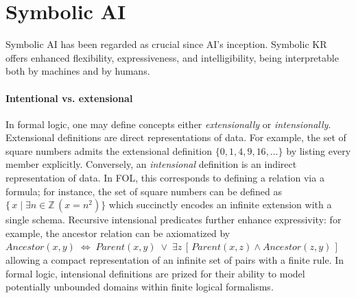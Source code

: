 \section[Symbolic AI]{Symbolic \Gls{AI}}\label{sec:symbolic-ai}
%
Symbolic \gls{AI} has been regarded as crucial since \gls{AI}'s inception.
%
Symbolic \gls{KR} offers enhanced flexibility, expressiveness, and intelligibility, being interpretable both by machines and by humans.

\paragraph{Intentional vs. extensional}
%
In formal logic, one may define concepts either \emph{extensionally} or \emph{intensionally}.
%
Extensional definitions are direct representations of data.
%
For example, the set of square numbers admits the extensional definition $\{0,1,4,9,16,\dots\}$ by listing every member explicitly.
%
Conversely, an \emph{intensional} definition is an indirect representation of data.
%
In \gls{FOL}, this corresponds to defining a relation via a formula; for instance, the set of square numbers can be defined as $\{\,x\mid \exists n\in\mathbb{Z}\,(x = n^2)\}$ which succinctly encodes an infinite extension with a single schema.
%
Recursive intensional predicates further enhance expressivity: for example, the ancestor relation can be axiomatized by $\mathit{Ancestor}(x,y)\;\Leftrightarrow\;\mathit{Parent}(x,y)\;\lor\;\exists z\,[\,\mathit{Parent}(x,z)\wedge\mathit{Ancestor}(z,y)\,]$ allowing a compact representation of an infinite set of pairs with a finite rule.
%
In formal logic, intensional definitions are prized for their ability to model potentially unbounded domains within finite logical formalisms.


